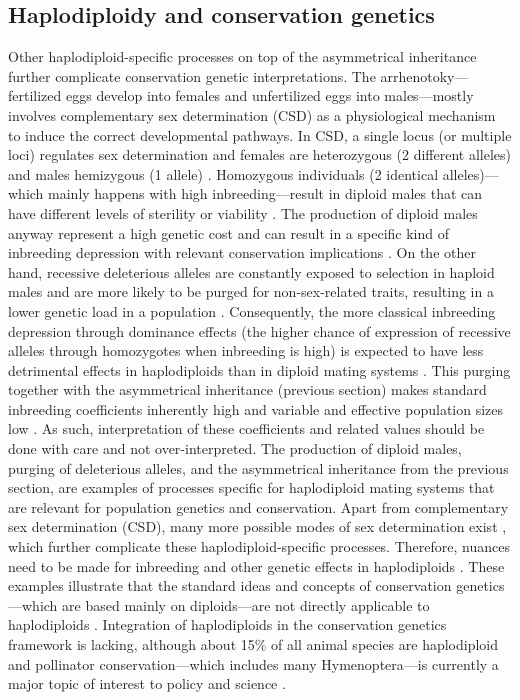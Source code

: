 \documentclass[10pt, twoside]{book} %
\begin{document}
	\subsection{Haplodiploidy and conservation genetics}
	Other haplodiploid-specific processes on top of the asymmetrical inheritance further complicate conservation genetic interpretations. The arrhenotoky---fertilized eggs develop into females and unfertilized eggs into males---mostly involves complementary sex determination (CSD) as a physiological mechanism to induce the correct developmental pathways. In CSD, a single locus (or multiple loci) regulates sex determination and females are heterozygous (2 different alleles) and males hemizygous (1 allele) \citep{beye2003, evans2004, heimpel2008}. Homozygous individuals (2 identical alleles)---which mainly happens with high inbreeding---result in diploid males that can have different levels of sterility or viability \citep{paxton2000, ayabe2004, liebert2005, heimpel2008, zayed2009}. The production of diploid males anyway represent a high genetic cost and can result in a specific kind of inbreeding depression with relevant conservation implications \citep{zayed2009}. On the other hand, recessive deleterious alleles are constantly exposed to selection in haploid males and are more likely to be purged for non-sex-related traits, resulting in a lower genetic load in a population \citep{tien2015}. Consequently, the more classical inbreeding depression through dominance effects (the higher chance of expression of recessive alleles through homozygotes when inbreeding is high) is expected to have less detrimental effects in haplodiploids than in diploid mating systems \citep{liautard2005, holzman2009}. This purging together with the asymmetrical inheritance (previous section) makes standard inbreeding coefficients inherently high and variable and effective population sizes low \citep{zayed2009}. As such, interpretation of these coefficients and related values should be done with care and not over-interpreted. The production of diploid males, purging of deleterious alleles, and the asymmetrical inheritance from the previous section, are examples of processes specific for haplodiploid mating systems that are relevant for population genetics and conservation. Apart from complementary sex determination (CSD), many more possible modes of sex determination exist \citep[e.g. pattern genome elimination (PGE) or thelytoky;][]{heimpel2008}, which further complicate these haplodiploid-specific processes. Therefore, nuances need to be made for inbreeding and other genetic effects in haplodiploids \citep{zayed2004, zayed2009, heimpel2008}. These examples illustrate that the standard ideas and concepts of conservation genetics---which are based mainly on diploids---are not directly applicable to haplodiploids \citep{zayed2009}. Integration of haplodiploids in the conservation genetics framework is lacking, although about 15$\%$ of all animal species are haplodiploid and pollinator conservation---which includes many Hymenoptera---is currently a major topic of interest to policy and science \citep{evans2004, lohse2015, potts2016}.\\
	\newpage
	
\end{document}
